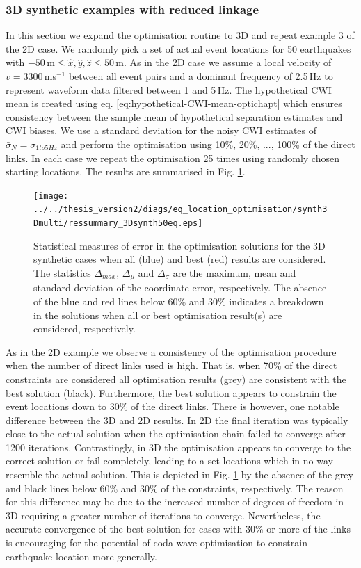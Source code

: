 \documentclass[extra]{gji}
\begin{document}
\subsubsection{3D synthetic examples with reduced linkage}

In this section we expand the optimisation routine to 3D and repeat example 3 of the 2D case.
We randomly pick a set of actual event locations for 50 earthquakes with
$-50$\,m$\leq \hat{x},\hat{y},\hat{z} \leq 50$\,m. As in the 2D case we assume a local velocity
of $v=3300\,$ms$^{-1}$ between all event pairs and a dominant frequency of 2.5$\,$Hz to represent
 waveform data filtered between 1 and 5$\,$Hz.
The hypothetical CWI mean is created using eq. \ref{eq:hypothetical-CWI-mean-optichapt}
which ensures consistency between the sample mean of hypothetical separation estimates and CWI
biases. We use a standard deviation for the noisy CWI estimates
of $\bar{\sigma}_N = \sigma_{1to5Hz}$ and perform the optimisation using 10\%,
20\%, ..., 100\% of the direct links.
In each case we repeat the
optimisation 25 times using randomly chosen starting locations. The results are
summarised in Fig. \ref{fig:optimisationresults-3Dsynth}.

\begin{figure}
\noindent\texttt{[image: ../../thesis\_version2/diags/eq\_location\_optimisation/synth3Dmulti/ressummary\_3Dsynth50eq.eps]}
\caption{Statistical measures of error in the optimisation solutions for the 3D synthetic cases when all (blue)
and best (red) results are considered. The statistics $\Delta_{max}$, $\Delta_\mu$ and
$\Delta_\sigma$ are the maximum, mean and standard deviation of the coordinate error, respectively.
The absence of the blue and red lines below 60\% and 30\% indicates a breakdown in the solutions
when all or best optimisation result(s) are considered, respectively.}
\label{fig:optimisationresults-3Dsynth}
\end{figure}

As in the 2D example we observe a consistency of the optimisation procedure when the number of direct links used
is high. That is, when 70\% of the direct constraints are considered all optimisation results (grey) are consistent with
the best solution (black). Furthermore, the best solution appears to constrain the event locations down to 30\%
of the direct links. There is however, one notable difference between the 3D and 2D results.
In 2D the final iteration was typically close to the actual solution
when the optimisation chain failed to converge after 1200 iterations. Contrastingly,
in 3D the optimisation appears to converge to the correct solution or fail completely, leading to a set locations which
in no way resemble the actual solution. This is depicted in Fig. \ref{fig:optimisationresults-3Dsynth}
by the absence of the grey and black lines below 60\% and 30\% of the constraints, respectively.
The reason for this difference may be due to the increased number of degrees
of freedom in 3D requiring a greater number of iterations to converge. Nevertheless, the accurate convergence of the best
solution for cases with 30\% or more of the links is encouraging for the potential
of coda wave optimisation to constrain earthquake location more generally.
\end{document}
